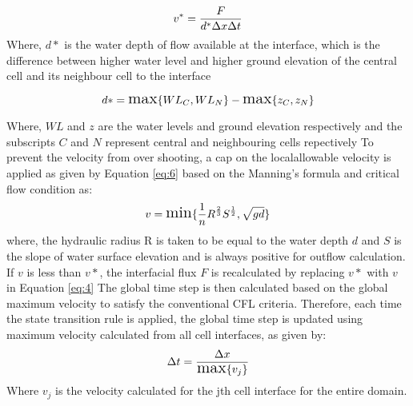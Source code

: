 \begin{equation} \label {eq:4}
	\Large v^{*} = \frac{F}{d^{*}\Delta{x}\Delta{t}}
\end{equation}
Where, $ d*$ is the water depth of flow available at the interface, which is the difference between higher water level and higher ground elevation of the central cell and its neighbour cell to the interface

\begin{equation} \label{eq:5}
	\Large d* = \text{max} \{WL_{C}, WL_{N}\} - \text{max}\{z_{C}, z_{N}\}
\end{equation}

Where, $WL$ and $z$ are the water levels and ground elevation respectively and the subscripts $C$ and $N$ represent central and neighbouring cells repectively
To prevent the velocity from over shooting, a cap on the localallowable velocity is applied as given by Equation \ref{eq:6} based on the Manning's formula and critical flow condition as:
\begin{equation} \label{eq:6}
	\Large v = \text{min}\{\frac{1}{n}R^{\frac{2}{3}}S^{\frac{1}{2}}, \sqrt{gd}\}
\end{equation}
where, the hydraulic radius R is taken to be equal to the water depth $d$ and $S$ is the slope of water surface elevation and is always positive for outflow calculation. If $v$ is less than $v*$, the interfacial flux $F$ is recalculated by replacing $v*$ with $v$ in Equation \ref{eq:4}
The global time step is then calculated based on the global maximum velocity to satisfy the conventional CFL criteria. Therefore, each time the state transition rule is applied, the global time step is updated using maximum velocity calculated from all cell interfaces, as given by:
\begin{equation} \label{eq:7}
	\Large \Delta{t} = \frac{\Delta{x}}{\text{max}\{v_{j}\}}
\end{equation}
Where $v_{j}$ is the velocity calculated for the jth cell interface for the entire domain.